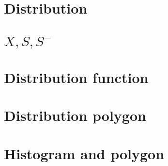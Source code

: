 



\date{\today}
\maketitle
\tableofcontents 

\chapter{Distribution}
%

\chapter{$X,S,S^-$}
% 
% 
% 

\chapter{Distribution function}
%   
\newpage
\begin{figure}[h]
\center{}
\end{figure}

\chapter{Distribution polygon}
\begin{figure}[h]
\center{}
\end{figure}

\chapter{Histogram and polygon}
\begin{figure}[h]
\center{}
\end{figure}





